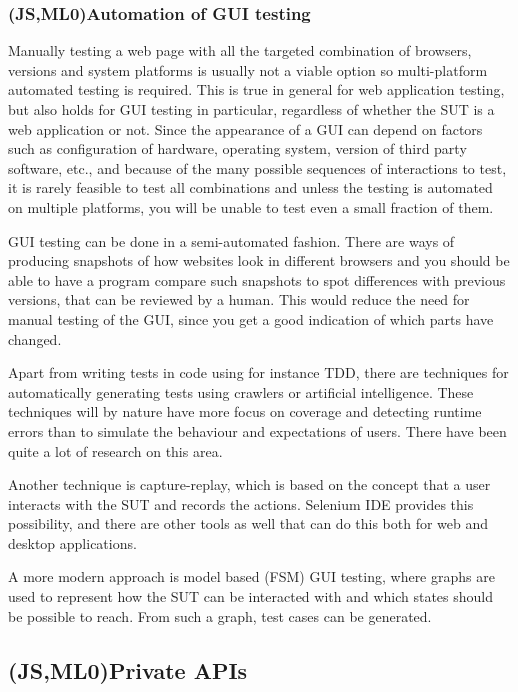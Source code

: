 \documentclass[11pt]{article}
\begin{document}
\subsubsection{(JS,ML0)Automation of GUI testing}

Manually testing a web page with all the targeted combination of browsers, versions and system platforms is usually not a viable option \cite{TestSwarm} so multi-platform automated testing is required. This is true in general for web application testing, but also holds for GUI testing in particular, regardless of whether the SUT is a web application or not. Since the appearance of a GUI can depend on factors such as configuration of hardware, operating system, version of third party software, etc., and because of the many possible sequences of interactions to test, it is rarely feasible to test all combinations and unless the testing is automated on multiple platforms, you will be unable to test even a small fraction of them.

GUI testing can be done in a semi-automated fashion. There are ways of producing snapshots of how websites look in different browsers and you should be able to have a program compare such snapshots to spot differences with previous versions, that can be reviewed by a human. This would reduce the need for manual testing of the GUI, since you get a good indication of which parts have changed. %

Apart from writing tests in code using for instance TDD, there are techniques for automatically generating tests using crawlers or artificial intelligence. These techniques will by nature have more focus on coverage and detecting runtime errors than to simulate the behaviour and expectations of users. There have been quite a lot of research on this area. %

Another technique is capture-replay, which is based on the concept that a user interacts with the SUT and records the actions. Selenium IDE provides this possibility, and there are other tools as well that can do this both for web and desktop applications.

A more modern approach is model based (FSM) GUI testing, where graphs are used to represent how the SUT can be interacted with and which states should be possible to reach. From such a graph, test cases can be generated.

\subsection{(JS,ML0)Private APIs}
\end{document}
